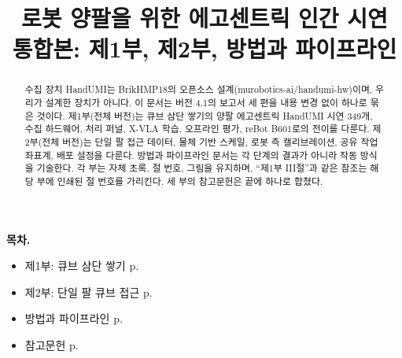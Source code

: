 \documentclass[conference,10pt]{IEEEtran}
\begin{document}
\title{로봇 양팔을 위한 에고센트릭 인간 시연\\[1mm]\Large 통합본: 제1부, 제2부, 방법과 파이프라인}
\author{
}
\maketitle
\begin{abstract}
수집 장치 HandUMI는 BrikHMP18의 오픈소스 설계(murobotics-ai/handumi-hw)이며, 우리가 설계한 장치가 아니다.
이 문서는 버전 4.1의 보고서 세 편을 내용 변경 없이 하나로 묶은 것이다. 제1부(전체 버전)는 큐브 삼단 쌓기의 양팔 에고센트릭
HandUMI 시연 349개, 수집 하드웨어, 처리 퍼널, X-VLA 학습, 오프라인 평가, reBot B601로의 전이를 다룬다. 제2부(전체 버전)는 단일 팔
접근 데이터, 물체 기반 스케일, 로봇 측 캘리브레이션, 공유 작업 좌표계, 배포 설정을 다룬다. 방법과 파이프라인 문서는 각 단계의 결과가
아니라 작동 방식을 기술한다. 각 부는 자체 초록, 절 번호, 그림을 유지하며, ``제1부 III절''과 같은 참조는 해당 부에 인쇄된 절 번호를
가리킨다. 세 부의 참고문헌은 끝에 하나로 합쳤다.
\end{abstract}

\noindent\textbf{목차.}
\begin{itemize}
\item 제1부: 큐브 삼단 쌓기 \dotfill p.~\pageref{part:p1}
\item 제2부: 단일 팔 큐브 접근 \dotfill p.~\pageref{part:p2}
\item 방법과 파이프라인 \dotfill p.~\pageref{part:m}
\item 참고문헌 \dotfill p.~\pageref{part:refs}
\end{itemize}
\end{document}
